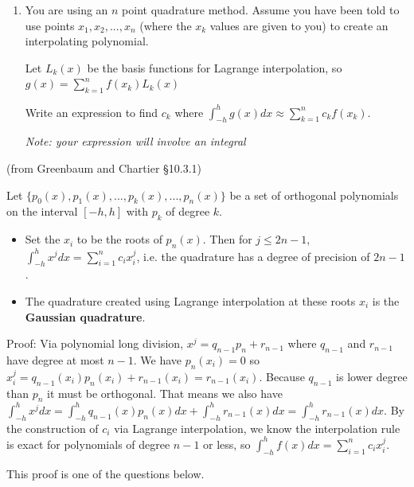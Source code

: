 \documentclass[12pt,letterpaper,noanswers]{exam}
\begin{document}
\begin{enumerate}[resume=classQ]
\item You are using an $n$ point quadrature method.  Assume you have been told to use points $x_1, x_2, ..., x_n$ (where the $x_k$ values are given to you) to create an interpolating polynomial.

Let $L_k(x)$ be the basis functions for Lagrange interpolation, so $g(x) = \sum\limits_{k=1}^n f(x_k) L_k(x)$

Write an expression to find $c_k$ where $\displaystyle\int_{-h}^h g(x) dx \approx \sum\limits_{k=1}^n c_k f(x_k)$.

\emph{Note: your expression will involve an integral}

\vspace{1in}




\end{enumerate}
\begin{tcolorbox}
(from Greenbaum and Chartier \S 10.3.1)

Let $\{p_0(x),p_1(x),...,p_k(x),...,p_n(x)\}$ be a set of orthogonal polynomials on the interval $[-h,h]$ with $p_k$ of degree $k$.
\begin{itemize}
\itemsep0pt
    \item Set the $x_i$ to be the roots of $p_n(x)$. Then for $j\leq 2n-1$, $\displaystyle \int_{-h}^h x^j dx = \sum\limits_{i=1}^n c_i x_i^j$, i.e. the quadrature has a degree of precision of $2n-1$.
    \item The quadrature created using Lagrange interpolation at these roots $x_i$ is the \textbf{Gaussian quadrature}.
\end{itemize}

Proof: Via polynomial long division, $x^j = q_{n-1}p_n + r_{n-1}$ where $q_{n-1}$ and $r_{n-1}$ have degree at most $n-1$.  We have $p_n(x_i) = 0$ so $x_i^j = q_{n-1}(x_i)p_n(x_i) + r_{n-1}(x_i) = r_{n-1}(x_i)$.  Because $q_{n-1}$ is lower degree than $p_n$ it must be orthogonal.  That means we also have $\int_{-h}^h x^j dx = \int_{-h}^h q_{n-1}(x)p_n(x)dx + \int_{-h}^h r_{n-1}(x)dx = \int_{-h}^h r_{n-1}(x) dx$.  By the construction of $c_i$ via Lagrange interpolation, we know the interpolation rule is exact for polynomials of degree $n-1$ or less, so $\int_{-h}^h f(x) dx = \sum\limits_{i=1}^n c_i x_i^j$.

This proof is one of the questions below.

\end{tcolorbox}
\end{document}
